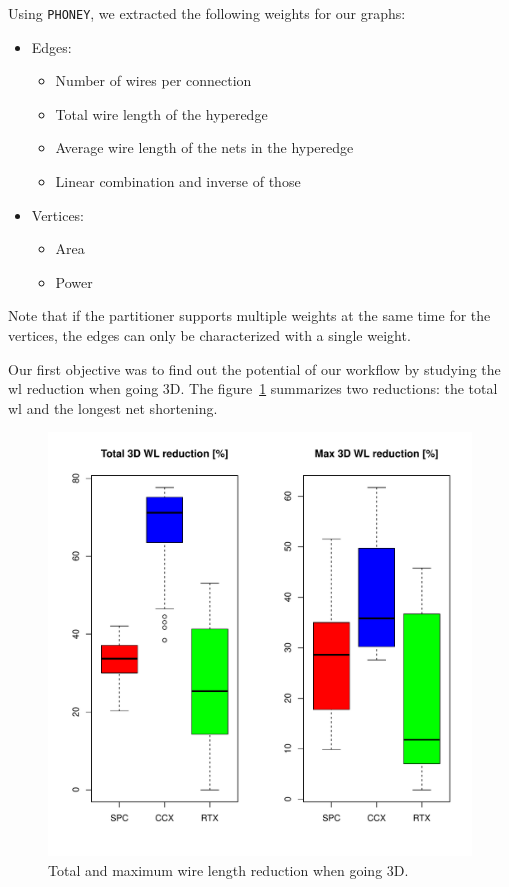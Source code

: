 \documentclass[11pt,a4paper]{report} %
\theoremstyle{customdef}
\begin{document}
Using \texttt{PHONEY}, we extracted the following weights for our graphs:
\begin{itemize}
	\item Edges:
	\begin{itemize}
		\item Number of wires per connection
		\item Total wire length of the hyperedge
		\item Average wire length of the nets in the hyperedge
		\item Linear combination and inverse of those
	\end{itemize}
	\item Vertices:
	\begin{itemize}
		\item Area
		\item Power
	\end{itemize}
\end{itemize}

Note that if the partitioner supports multiple weights at the same time for the vertices, the edges can only be characterized with a single weight.

Our first objective was to find out the potential of our workflow by studying the \gls{wl} reduction when going 3D.
The figure~\ref{fig:res-3dwl} summarizes two reductions: the total \gls{wl} and the longest net shortening.

\begin{figure}[!h]
\centering
\includegraphics[width=.8\textwidth]{img/3DWL.pdf}
\caption{Total and maximum wire length reduction when going 3D.}
\label{fig:res-3dwl}
\end{figure}
\end{document}
